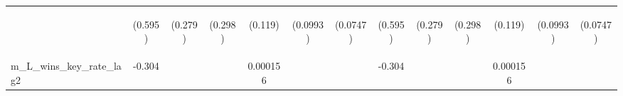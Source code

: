 \documentclass[]{article}
\begin{document}
\begin{center}
\begin{tabular}{lcccccccccccc}
\vspace{4pt} & \begin{footnotesize}(0.595)\end{footnotesize} & \begin{footnotesize}(0.279)\end{footnotesize} & \begin{footnotesize}(0.298)\end{footnotesize} & \begin{footnotesize}(0.119)\end{footnotesize} & \begin{footnotesize}(0.0993)\end{footnotesize} & \begin{footnotesize}(0.0747)\end{footnotesize} & \begin{footnotesize}(0.595)\end{footnotesize} & \begin{footnotesize}(0.279)\end{footnotesize} & \begin{footnotesize}(0.298)\end{footnotesize} & \begin{footnotesize}(0.119)\end{footnotesize} & \begin{footnotesize}(0.0993)\end{footnotesize} & \begin{footnotesize}(0.0747)\end{footnotesize} \\
m\_L\_wins\_key\_rate\_lag2 & -0.304 &  &  & 0.000156 &  &  & -0.304 &  &  & 0.000156 &  &  \\

\end{tabular}
\end{center}
\end{document}

